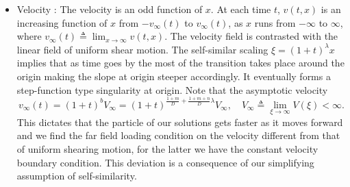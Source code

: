 \documentclass[a4paper,11pt]{article}
\begin{document}
\begin{itemize}
\item Velocity : The velocity is an odd function of $x$. At each time $t$, $v(t,x)$ is an increasing function of $x$ from $-v_\infty(t)$ to $v_\infty(t)$, as $x$ runs from $-\infty$ to $\infty$, where $v_\infty(t)\triangleq \lim_{x \rightarrow \infty} v(t,x)$. The velocity field is contrasted with the linear field of uniform shear motion. The self-similar scaling  $\xi=(1+t)^\lambda x$ implies that as time goes by the most of the transition takes place around the origin making the slope at origin steeper accordingly. It eventually forms a step-function type singularity at origin. Note that the asymptotic velocity $$v_\infty(t)=(1+t)^{b}V_\infty = (1+t)^{\frac{1+m}{D} + \frac{1+m+n}{D}\lambda}V_\infty, \quad V_\infty \triangleq \lim_{\xi \rightarrow \infty} V(\xi) <\infty.$$
This dictates that the particle of our solutions gets faster as it moves forward and we find the far field loading condition on the velocity different from that of uniform shearing motion, for the latter we have the constant velocity boundary condition. This deviation is a consequence of our simplifying assumption of self-similarity.
\end{itemize}
\end{document}
